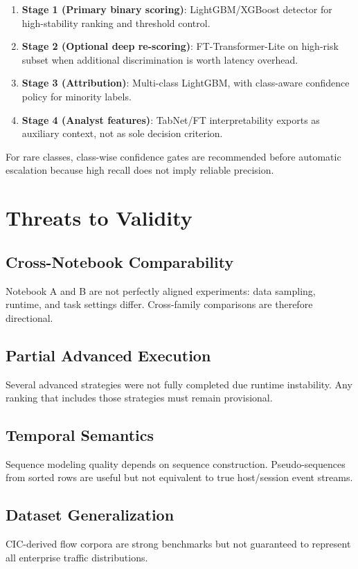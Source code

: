 \documentclass[10pt,journal]{IEEEtran}
\begin{document}
\begin{enumerate}
\item \textbf{Stage 1 (Primary binary scoring)}: LightGBM/XGBoost detector for high-stability ranking and threshold control.
\item \textbf{Stage 2 (Optional deep re-scoring)}: FT-Transformer-Lite on high-risk subset when additional discrimination is worth latency overhead.
\item \textbf{Stage 3 (Attribution)}: Multi-class LightGBM, with class-aware confidence policy for minority labels.
\item \textbf{Stage 4 (Analyst features)}: TabNet/FT interpretability exports as auxiliary context, not as sole decision criterion.
\end{enumerate}

For rare classes, class-wise confidence gates are recommended before automatic escalation because high recall does not imply reliable precision.

\section{Threats to Validity}
\subsection{Cross-Notebook Comparability}
Notebook A and B are not perfectly aligned experiments: data sampling, runtime, and task settings differ. Cross-family comparisons are therefore directional.

\subsection{Partial Advanced Execution}
Several advanced strategies were not fully completed due runtime instability. Any ranking that includes those strategies must remain provisional.

\subsection{Temporal Semantics}
Sequence modeling quality depends on sequence construction. Pseudo-sequences from sorted rows are useful but not equivalent to true host/session event streams.

\subsection{Dataset Generalization}
CIC-derived flow corpora are strong benchmarks but not guaranteed to represent all enterprise traffic distributions.
\end{document}
